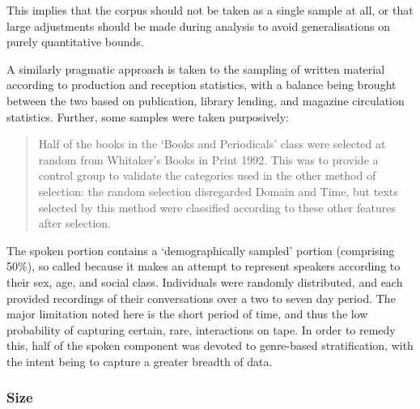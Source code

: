 This implies that the corpus should not be taken as a single sample at all, or that large adjustments should be made during analysis to avoid generalisations on purely quantitative bounds.

A similarly pragmatic approach is taken to the sampling of written material according to production and reception statistics, with a balance being brought between the two based on publication, library lending, and magazine circulation statistics.  Further, some samples were taken purposively\cite[p.10]{lou1995users}:

\begin{quote}
Half of the books in the ‘Books and Periodicals’ class were selected at random from Whitaker's Books in Print 1992. This was to provide a control group to validate the categories used in the other method of selection:  the random selection disregarded Domain and Time, but texts selected by this method were classified according to these other features after selection.
\end{quote}

The spoken portion contains a `demographically sampled' portion (comprising 50\%), so called because it makes an attempt to represent speakers according to their sex, age, and social class.  Individuals were randomly distributed, and each provided recordings of their conversations over a two to seven day period.  The major limitation noted here is the short period of time, and thus the low probability of capturing certain, rare, interactions on tape.  In order to remedy this, half of the spoken component was devoted to genre-based stratification, with the intent being to capture a greater breadth of data.












\subsubsection{Size}

